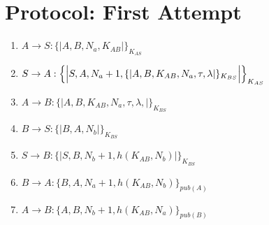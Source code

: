 \section{Protocol: First Attempt}

\begin{enumerate}
    \item $ A \rightarrow S : \{|A, B, N_a, K_{AB}|\}_{K_{AS}}$
    \item $ S \rightarrow A : \Bigl\{\Bigl|S,A, N_a + 1, \{|A,B,K_{AB},N_a, \tau, \lambda |\}_{K_{BS}}\Bigr|\Bigr\}_{K_{AS}}$
    \item $ A \rightarrow B : \{|A,B,K_{AB},N_a, \tau, \lambda, |\}_{K_{BS}}$
    \item $ B \rightarrow S : \{|B, A, N_b|\}_{K_{BS}}$
    \item $ S \rightarrow B : \{|S, B, N_b + 1, h(K_{AB}, N_b)|\}_{K_{BS}}$
    \item $ B \rightarrow A : \{B, A, N_a+1, h(K_{AB}, N_b)\}_{pub(A)}$
    \item $ A \rightarrow B : \{A, B, N_b+1, h(K_{AB}, N_a)\}_{pub(B)}$

\end{enumerate}